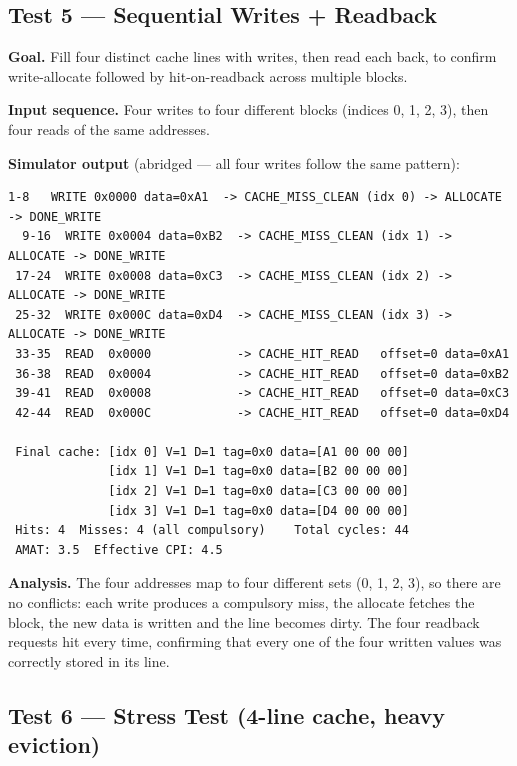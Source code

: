 \documentclass[11pt,a4paper]{article}
\begin{document}
\subsection{Test 5 — Sequential Writes + Readback}

\textbf{Goal.} Fill four distinct cache lines with writes, then read each
back, to confirm write-allocate followed by hit-on-readback across multiple
blocks.

\textbf{Input sequence.} Four writes to four different blocks (indices 0, 1,
2, 3), then four reads of the same addresses.

\textbf{Simulator output} (abridged — all four writes follow the same pattern):
\begin{lstlisting}[style=trace]
  1-8   WRITE 0x0000 data=0xA1  -> CACHE_MISS_CLEAN (idx 0) -> ALLOCATE -> DONE_WRITE
  9-16  WRITE 0x0004 data=0xB2  -> CACHE_MISS_CLEAN (idx 1) -> ALLOCATE -> DONE_WRITE
 17-24  WRITE 0x0008 data=0xC3  -> CACHE_MISS_CLEAN (idx 2) -> ALLOCATE -> DONE_WRITE
 25-32  WRITE 0x000C data=0xD4  -> CACHE_MISS_CLEAN (idx 3) -> ALLOCATE -> DONE_WRITE
 33-35  READ  0x0000            -> CACHE_HIT_READ   offset=0 data=0xA1
 36-38  READ  0x0004            -> CACHE_HIT_READ   offset=0 data=0xB2
 39-41  READ  0x0008            -> CACHE_HIT_READ   offset=0 data=0xC3
 42-44  READ  0x000C            -> CACHE_HIT_READ   offset=0 data=0xD4

 Final cache: [idx 0] V=1 D=1 tag=0x0 data=[A1 00 00 00]
              [idx 1] V=1 D=1 tag=0x0 data=[B2 00 00 00]
              [idx 2] V=1 D=1 tag=0x0 data=[C3 00 00 00]
              [idx 3] V=1 D=1 tag=0x0 data=[D4 00 00 00]
 Hits: 4  Misses: 4 (all compulsory)    Total cycles: 44
 AMAT: 3.5  Effective CPI: 4.5
\end{lstlisting}

\textbf{Analysis.} The four addresses map to four different sets (0, 1, 2,
3), so there are no conflicts: each write produces a compulsory miss, the
allocate fetches the block, the new data is written and the line becomes
dirty. The four readback requests hit every time, confirming that every one
of the four written values was correctly stored in its line.

\subsection{Test 6 — Stress Test (4-line cache, heavy eviction)}
\end{document}
